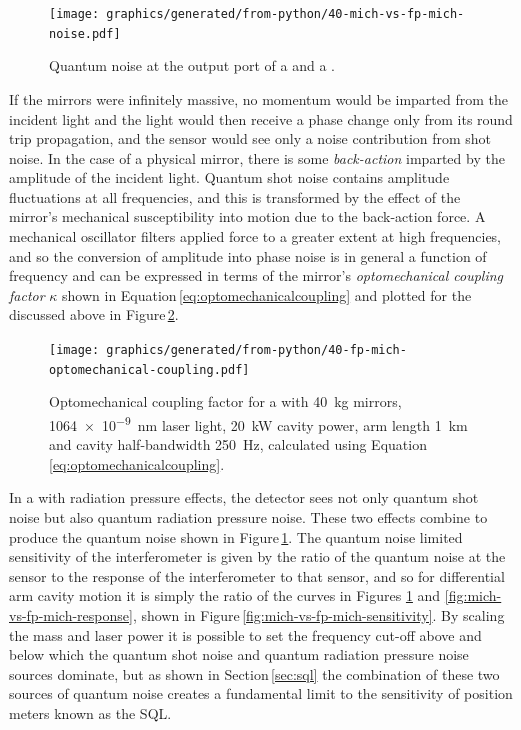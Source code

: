 \begin{figure}
  \centering
  \texttt{[image: graphics/generated/from-python/40-mich-vs-fp-mich-noise.pdf]}
  \caption[Quantum noise of a Michelson and Fabry-Perot Michelson]{\label{fig:mich-vs-fp-mich-noise}Quantum noise at the output port of a \MI{} and a \FPMI{}.}
\end{figure}

If the mirrors were infinitely massive, no momentum would be imparted from the incident light and the light would then receive a phase change only from its round trip propagation, and the sensor would see only a noise contribution from shot noise. In the case of a physical mirror, there is some \emph{back-action} imparted by the amplitude of the incident light. Quantum shot noise contains amplitude fluctuations at all frequencies, and this is transformed by the effect of the mirror's mechanical susceptibility into motion due to the back-action force. A mechanical oscillator filters applied force to a greater extent at high frequencies, and so the conversion of amplitude into phase noise is in general a function of frequency and can be expressed in terms of the mirror's \emph{optomechanical coupling factor} $\kappa$ shown in Equation\,\ref{eq:optomechanicalcoupling} and plotted for the \FPMI{} discussed above in Figure\,\ref{fig:fp-mich-optomechanical-coupling}.

\begin{figure}
  \centering
  \texttt{[image: graphics/generated/from-python/40-fp-mich-optomechanical-coupling.pdf]}
  \caption[Optomechanical coupling factor for a \FPMI{}]{\label{fig:fp-mich-optomechanical-coupling}Optomechanical coupling factor for a \FPMI{} with \SI{40}{\kilo\gram} mirrors, \SI{1064e-9}{\nano\meter} laser light, \SI{20}{\kilo\watt} cavity power, arm length \SI{1}{\kilo\meter} and cavity half-bandwidth \SI{250}{\hertz}, calculated using Equation\,\ref{eq:optomechanicalcoupling}.}
\end{figure}

In a \FPMI{} with radiation pressure effects, the detector sees not only quantum shot noise but also quantum radiation pressure noise. These two effects combine to produce the quantum noise shown in Figure\,\ref{fig:mich-vs-fp-mich-noise}. The quantum noise limited sensitivity of the interferometer is given by the ratio of the quantum noise at the sensor to the response of the interferometer to that sensor, and so for differential arm cavity motion it is simply the ratio of the curves in Figures \ref{fig:mich-vs-fp-mich-noise} and \ref{fig:mich-vs-fp-mich-response}, shown in Figure\,\ref{fig:mich-vs-fp-mich-sensitivity}. By scaling the mass and laser power it is possible to set the frequency cut-off above and below which the quantum shot noise and quantum radiation pressure noise sources dominate, but as shown in Section\,\ref{sec:sql} the combination of these two sources of quantum noise creates a fundamental limit to the sensitivity of position meters known as the \gls{SQL}.

